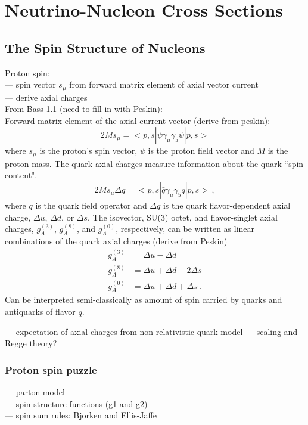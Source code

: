 \section{Neutrino-Nucleon Cross Sections} \label{sec:theory}
\hspace{\parindent}

\subsection{The Spin Structure of Nucleons} \label{sec:nuctheory}
  Proton spin: \\
  --- spin vector $s_{\mu}$ from forward matrix element of axial vector current \\
  --- derive axial charges \\
  From Bass 1.1 (need to fill in with Peskin): \\
  Forward matrix element of the axial current vector (derive from peskin):
  \[
      2Ms_{\mu} = <p,s|\bar{\psi}\gamma_{\mu} \gamma_{5} \psi|p,s>
  \]
  where $s_{\mu}$ is the proton's spin vector, $\psi$ is the proton field
  vector and $M$ is the proton mass. The quark axial charges measure
  information about the quark ``spin content".
  \[
    2Ms_{\mu}\Delta q = <p,s| \bar{q}\gamma_{\mu}\gamma_{5}q|p,s> \,,
  \]
  where $q$ is the quark field operator and $\Delta q$ is the quark
  flavor-dependent axial charge, $\Delta u$, $\Delta d$, or $\Delta s$. The
  isovector, SU(3) octet, and flavor-singlet axial charges, $g_A^{(3)}$,
  $g_A^{(8)}$, and $g_A^{(0)}$, respectively, can be written as linear
  combinations of the quark axial charges (derive from Peskin)
  \begin{align}
      g_A^{(3)} &= \Delta u - \Delta d \\
      g_A^{(8)} &= \Delta u + \Delta d - 2\Delta s \\
      g_A^{(0)} &= \Delta u + \Delta d + \Delta s \,.
  \end{align}
  Can be interpreted semi-classically as amount of spin carried by quarks and
  antiquarks of flavor $q$.


  --- expectation of axial charges from non-relativistic quark model
  --- scaling and Regge theory?
  \subsubsection{Proton spin puzzle}
    --- parton model \\
    --- spin structure functions (g1 and g2) \\
    --- spin sum rules: Bjorken and Ellis-Jaffe \\
